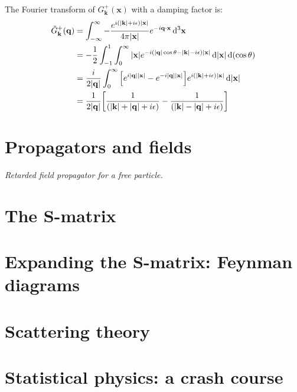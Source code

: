 \documentclass{report}
\begin{document}
\begin{subquests}
\begin{subquests}
		\item The Fourier transform of $G^+_{\mathbf k}(\mathbf x)$ with a damping factor is:
		\begin{align*}
			\tilde G^+_{\mathbf k}(\mathbf q) & = \int_{-\infty}^{\infty} -\frac{e^{i\pqty{\abs{\mathbf k} + i\epsilon}\abs{\mathbf x}}}{4\pi\abs{\mathbf x}}e^{-i\vb q\cdot \vb x}\,\dd^3{\vb x} \\ 
			& = -\frac{1}{2}\int_{-1}^{1}\int_0^{\infty}{\abs{\mathbf x}e^{-i\pqty{\abs{\mathbf q}\cos\theta -\abs{\mathbf k} - i\epsilon}\abs{\mathbf x}}} \dd{\abs{\mathbf x}}\dd\pqty{\cos\theta} \\
			& = \frac{i}{2\abs{\mathbf q}}\int_{0}^{\infty} \bqty{e^{i\abs{\mathbf q}\abs{\mathbf x}}- e^{-i\abs{\mathbf q}\abs{\mathbf x}}}e^{i\pqty{\abs{\mathbf k} + i\epsilon}\abs{\mathbf x}} \dd{\abs{\mathbf x}} \\
			& = \frac{1}{2\abs{\vb q}}\bqty{\frac{1}{\pqty{\abs{\vb k} + \abs{\vb q} + i\epsilon}}- \frac{1}{ \pqty{\abs{\vb k} - \abs{\vb q} + i\epsilon}}}
		\end{align*}

		\item
	\end{subquests}
\end{subquests}


\chapter{Propagators and fields}

\begin{subquests}
	\item \emph{Retarded field propagator for a free particle.}

\end{subquests}

\chapter{The S-matrix}

\chapter{Expanding the S-matrix: Feynman diagrams}

\chapter{Scattering theory}

\chapter{Statistical physics: a crash course}
\end{document}
